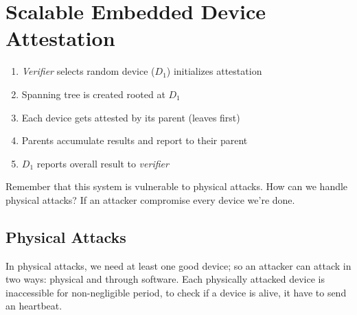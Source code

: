 \section{Scalable Embedded Device Attestation}

\begin{enumerate}
	\item \textit{Verifier} selects random device ($D_1$) initializes attestation
	\item Spanning tree is created rooted at $D_1$
	\item Each device gets attested by its parent (leaves first)
	\item Parents accumulate results and report to their parent
	\item $D_1$ reports overall result to \textit{verifier}
\end{enumerate}

Remember that this system is vulnerable to physical attacks. How can we handle 
physical attacks? If an attacker compromise every device we're done.

\subsection{Physical Attacks}
In physical attacks, we need at least one good device; so an attacker can 
attack in two ways: physical and through software.
Each physically attacked device is inaccessible for non-negligible period, to 
check if a device is alive, it have to send an heartbeat.